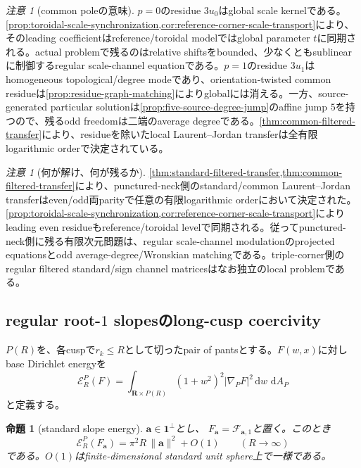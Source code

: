 \documentclass[11pt,a4paper]{ltjsarticle}
\newtheorem{proposition}[theorem]{命題}
\theoremstyle{definition}
\theoremstyle{remark}
\newtheorem{remark}[theorem]{注意}
\newcommand{\RR}{\mathbf R}
\newcommand{\dd}{\,\mathrm d}
\newcommand{\one}{\mathbf 1}
\begin{document}
\begin{remark}[common poleの意味]
$p=0$のresidue $3u_0$はglobal scale kernelである。\cref{prop:toroidal-scale-synchronization,cor:reference-corner-scale-transport}により、そのleading coefficientはreference/toroidal modelではglobal parameter $t$に同期される。actual problemで残るのはrelative shiftsをbounded、少なくともsublinearに制御するregular scale-channel equationである。$p=1$のresidue $3u_1$はhomogeneous topological/degree modeであり、orientation-twisted common residueは\cref{prop:residue-graph-matching}によりglobalには消える。一方、source-generated particular solutionは\cref{prop:five-source-degree-jump}のaffine jump $5$を持つので、残るodd freedomは二端のaverage degreeである。\cref{thm:common-filtered-transfer}により、residueを除いたlocal Laurent--Jordan transferは全有限logarithmic orderで決定されている。
\end{remark}

\begin{remark}[何が解け、何が残るか]
\cref{thm:standard-filtered-transfer,thm:common-filtered-transfer}により、punctured-neck側のstandard/common Laurent--Jordan transferはeven/odd両parityで任意の有限logarithmic orderにおいて決定された。\cref{prop:toroidal-scale-synchronization,cor:reference-corner-scale-transport}によりleading even residueもreference/toroidal levelで同期される。従ってpunctured-neck側に残る有限次元問題は、regular scale-channel modulationのprojected equationsとodd average-degree/Wronskian matchingである。triple-corner側のregular filtered standard/sign channel matricesはなお独立のlocal problemである。
\end{remark}

\subsection{regular root-$1$ slopesのlong-cusp coercivity}

$P(R)$を、各cuspで$r_k\le R$として切ったpair of pantsとする。$F(w,x)$に対しbase Dirichlet energyを
\begin{equation}\label{eq:base-dirichlet-energy}
 \mathcal E_R^P(F)
 =\int_{\RR\times P(R)}
 (1+w^2)^2|\nabla_PF|^2
 \dd w\,\dd A_P
\end{equation}
と定義する。

\begin{proposition}[standard slope energy]
\label{prop:standard-slope-energy}
$\mathbf a\in\one^\perp$とし、
$F_{\mathbf a}=\mathcal F_{\mathbf a,1}$と置く。このとき
\begin{equation}\label{eq:standard-slope-energy-asymptotic}
 \boxed{
 \mathcal E_R^P(F_{\mathbf a})
 =\pi^2R\,\|\mathbf a\|^2+O(1)
 \qquad(R\to\infty)
 }
\end{equation}
である。$O(1)$はfinite-dimensional standard unit sphere上で一様である。
\end{proposition}
\end{document}
